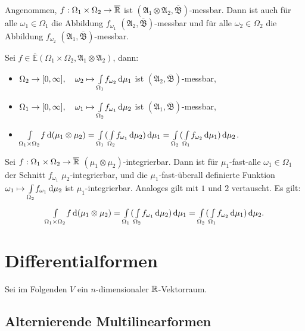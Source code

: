 \documentclass{cheat-sheet}
\newcommand{\ER}{\overline\R} %
\newcommand{\Alg}{\mathfrak{A}} %
\newcommand{\Bor}{\mathfrak{B}} %
\newcommand{\E}{\mathbb{E}} %
\begin{document}
\begin{lem}
  Angenommen, $f : \Omega_1 \times \Omega_2 \to \ER$ ist $(\Alg_1 \otimes \Alg_2, \overline{\Bor})$-messbar. Dann ist auch für alle $\omega_1 \in \Omega_1$ die Abbildung $f_{\omega_1}$ $(\Alg_2, \overline{\Bor})$-messbar und für alle $\omega_2 \in \Omega_2$ die Abbildung $f_{\omega_2}$ $(\Alg_1, \overline{\Bor})$-messbar.
\end{lem}

\begin{satz}[Tonelli]
  Sei $f \in \overline{\E}(\Omega_1 \times \Omega_2, \Alg_1 \otimes \Alg_2)$, dann:
  \begin{itemize}
    \item $\Omega_2 \to [0, \infty], \quad \omega_2 \mapsto {\textstyle \int\limits_{\Omega_1}^{}} f_{\omega_2} \,\mathrm{d} \mu_1$ ist $(\Alg_2, \overline{\Bor})$-messbar,
    \item $\Omega_1 \to [0, \infty], \quad \omega_1 \mapsto {\textstyle \int\limits_{\Omega_2}^{}} f_{\omega_1} \,\mathrm{d} \mu_2$ ist $(\Alg_1, \overline{\Bor})$-messbar,
    \item ${\textstyle \int\limits_{\Omega_1 \times \Omega_2}^{}} f \,\mathrm{d} (\mu_1 \otimes \mu_2) = {\textstyle \int\limits_{\Omega_1}^{}} ({\textstyle \int\limits_{\Omega_2}^{}} f_{\omega_1} \,\mathrm{d} \mu_2) \,\mathrm{d} \mu_1 = {\textstyle \int\limits_{\Omega_2}^{}} ({\textstyle \int\limits_{\Omega_1}^{}} f_{\omega_2} \,\mathrm{d} \mu_1) \,\mathrm{d} \mu_2$.
  \end{itemize}
\end{satz}

\begin{satz}[Fubini]
  Sei $f : \Omega_1 \times \Omega_2 \to \ER$ $(\mu_1 \otimes \mu_2)$-integrierbar. Dann ist für $\mu_1$-fast-alle $\omega_1 \in \Omega_1$ der Schnitt $f_{\omega_1}$ $\mu_2$-integrierbar, und die $\mu_1$-fast-überall definierte Funktion $\omega_1 \mapsto {\textstyle \int\limits_{\Omega_2}^{}} f_{\omega_1} \,\mathrm{d} \mu_2$ ist $\mu_1$-integrierbar. Analoges gilt mit $1$ und $2$ vertauscht. Es gilt:
  \[ {\textstyle \int\limits_{\Omega_1 \times \Omega_2}^{}} f \,\mathrm{d} (\mu_1 \otimes \mu_2) = {\textstyle \int\limits_{\Omega_1}^{}} ({\textstyle \int\limits_{\Omega_2}^{}} f_{\omega_1} \,\mathrm{d} \mu_2) \,\mathrm{d} \mu_1 = {\textstyle \int\limits_{\Omega_2}^{}} ({\textstyle \int\limits_{\Omega_1}^{}} f_{\omega_2} \,\mathrm{d} \mu_1) \,\mathrm{d} \mu_2. \]
\end{satz}


\section{Differentialformen}

\begin{nota}
  Sei im Folgenden $V$ ein $n$-dimensionaler $\mathbb{R}$-Vektorraum.
\end{nota}

\subsection{Alternierende Multilinearformen}
\end{document}

